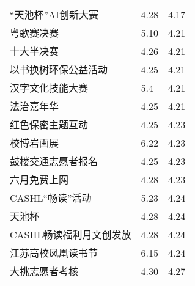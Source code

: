 \documentclass[letterpaper, 12pt]{article}
\begin{document}
\begin{multicols}{2}
{\begin{longtable}{|>{\centering\arraybackslash}m{}|m{}|m{}|}
    “天池杯”AI创新大赛 & 4.28 & 4.17\\
    粤歌赛决赛 & 5.10 & 4.21\\
    十大半决赛 & 4.26 & 4.21\\
    以书换树环保公益活动 & 4.25 & 4.21\\
    汉字文化技能大赛 & 5.4 & 4.21\\ 
    法治嘉年华 & 4.25 & 4.21\\
    红色保密主题互动 & 4.25 & 4.23\\
    校博岩画展 & 6.22 & 4.23\\
    鼓楼交通志愿者报名 & 4.25 & 4.23\\
    六月免费上网 & 4.28 & 4.23\\
    CASHL“畅读”活动 & 5.23 & 4.24\\
    天池杯 & 4.28 & 4.24\\
    CASHL畅读福利月文创发放 & 4.28 & 4.24\\
    江苏高校凤凰读书节 & 6.15 & 4.24\\
    大挑志愿者考核 & 4.30 & 4.27\\
    
    \hline
\end{longtable}
\unskip
\unpenalty
\unpenalty}\unvbox\colbbox
\end{multicols}
\end{document}
